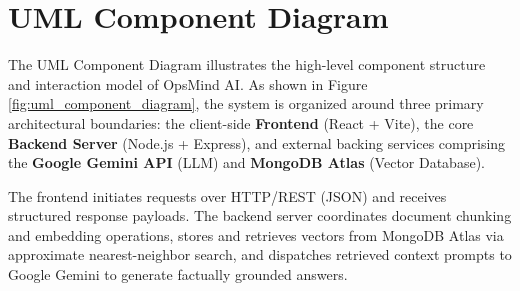 \section{UML Component Diagram}
\label{sec:design_component_diagram}

The UML Component Diagram illustrates the high-level component structure and interaction model of OpsMind AI. As shown in Figure \ref{fig:uml_component_diagram}, the system is organized around three primary architectural boundaries: the client-side \textbf{Frontend} (React + Vite), the core \textbf{Backend Server} (Node.js + Express), and external backing services comprising the \textbf{Google Gemini API} (LLM) and \textbf{MongoDB Atlas} (Vector Database). 

The frontend initiates requests over HTTP/REST (JSON) and receives structured response payloads. The backend server coordinates document chunking and embedding operations, stores and retrieves vectors from MongoDB Atlas via approximate nearest-neighbor search, and dispatches retrieved context prompts to Google Gemini to generate factually grounded answers.


